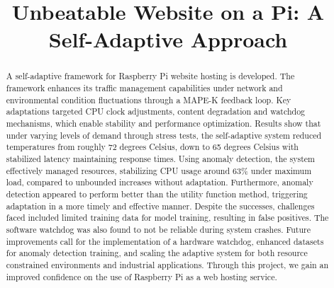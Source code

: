 \documentclass[conference]{IEEEtran}
\begin{document}
\title{Unbeatable Website on a Pi: A Self-Adaptive Approach\\
}

\author{

    \and

}

\maketitle

\begin{abstract}
A self-adaptive framework for Raspberry Pi website hosting is developed. The framework enhances its traffic management capabilities under network and environmental condition fluctuations through a MAPE-K feedback loop. Key adaptations targeted CPU clock adjustments, content degradation and watchdog mechanisms, which enable stability and performance optimization. Results show that under varying levels of demand through stress tests, the self-adaptive system reduced temperatures from roughly 72 degrees Celsius, down to 65 degrees Celsius with stabilized latency maintaining response times. Using anomaly detection, the system effectively managed resources, stabilizing CPU usage around 63\% under maximum load, compared to unbounded increases without adaptation. Furthermore, anomaly detection appeared to perform better than the utility function method, triggering adaptation in a more timely and effective manner. Despite the successes, challenges faced included limited training data for model training, resulting in false positives. The software watchdog was also found to not be reliable during system crashes. Future improvements call for the implementation of a hardware watchdog, enhanced datasets for anomaly detection training, and scaling the adaptive system for both resource constrained environments and industrial applications. Through this project, we gain an improved confidence on the use of Raspberry Pi as a web hosting service.
\end{abstract}
\end{document}
